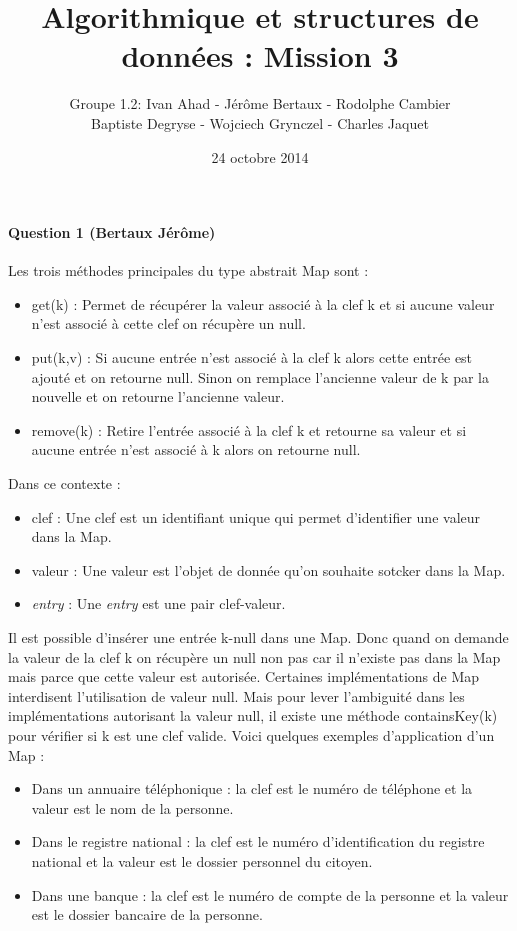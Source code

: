 \documentclass[a4paper]{article}
\title{Algorithmique et structures de données : Mission 3}
\date{24 octobre 2014}
\author{Groupe 1.2: Ivan Ahad - Jérôme Bertaux - Rodolphe Cambier \\ 
	Baptiste Degryse - Wojciech Grynczel - Charles Jaquet}
\begin{document}
\maketitle



\paragraph{Question 1 (Bertaux Jérôme)}
Les trois méthodes principales du type abstrait Map sont :
\begin{itemize}
\item get(k) : Permet de récupérer la valeur associé à la clef k et si aucune valeur n'est associé à cette clef on récupère un null.
\item put(k,v) : Si aucune entrée n'est associé à la clef k alors cette entrée est ajouté et on retourne null. Sinon on remplace l'ancienne valeur de k par la nouvelle et on retourne l'ancienne valeur.
\item remove(k) : Retire l'entrée associé à la clef k et retourne sa valeur et si aucune entrée n'est associé à k alors on retourne null.
\end{itemize}
Dans ce contexte :
\begin{itemize}
\item clef : Une clef est un identifiant unique qui permet d'identifier une valeur dans la Map. 
\item valeur : Une valeur est l'objet de donnée qu'on souhaite sotcker dans la Map.
\item \textit{entry} : Une \textit{entry} est une  pair clef-valeur.
\end{itemize}
Il est possible d'insérer une entrée k-null dans une Map. Donc quand on demande la valeur de la clef k on récupère un null non pas car il n'existe pas dans la Map mais parce que cette valeur est autorisée. Certaines implémentations de Map interdisent l'utilisation de valeur null. Mais pour lever l'ambiguité dans les implémentations autorisant la valeur null, il existe une méthode containsKey(k) pour vérifier si k est une clef valide.
Voici quelques exemples d'application d'un Map :
\begin{itemize}
\item Dans un annuaire téléphonique : la clef est le numéro de téléphone et la valeur est le nom de la personne.
\item Dans le registre national : la clef est le numéro d'identification du registre national et la valeur est le dossier personnel du citoyen.
\item Dans une banque : la clef est le numéro de compte de la personne et la valeur est le dossier bancaire de la personne.
\end{itemize}
\end{document}

